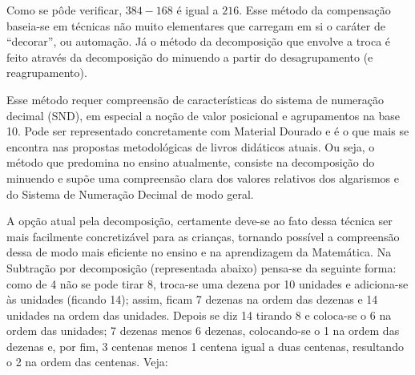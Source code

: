 \begin{refsection}
    \begin{center}       
    \end{center}

    Como se pôde verificar, $384 - 168$ é igual a $216$. Esse método da compensação baseia-se em técnicas não muito elementares que carregam em si o caráter de “decorar”, ou automação. Já o método da decomposição que envolve a troca é feito através da decomposição do minuendo a partir do desagrupamento (e reagrupamento).

    Esse método requer compreensão de características do sistema de numeração decimal (SND), em especial a noção de valor posicional e agrupamentos na base 10. Pode ser representado concretamente com Material Dourado e é o que mais se encontra nas propostas metodológicas de livros didáticos atuais. Ou seja, o método que predomina no ensino atualmente, consiste na decomposição do minuendo e supõe uma compreensão clara dos valores relativos dos algarismos e do Sistema de Numeração Decimal de modo geral.  

    A opção atual pela decomposição, certamente deve-se ao fato dessa técnica ser mais facilmente concretizável para as crianças, tornando possível a compreensão dessa de modo mais eficiente no ensino e na aprendizagem da Matemática. Na Subtração por decomposição (representada abaixo) pensa-se da seguinte forma: como de 4 não se pode tirar 8, troca-se uma dezena por 10 unidades e adiciona-se às unidades (ficando 14); assim, ficam 7 dezenas na ordem das dezenas e 14 unidades na ordem das unidades. Depois se diz 14 tirando 8 e coloca-se o 6 na ordem das unidades; 7 dezenas menos 6 dezenas, colocando-se o 1 na ordem das dezenas e, por fim, 3 centenas menos 1 centena igual a duas centenas, resultando o 2 na ordem das centenas. Veja:


\end{refsection}

